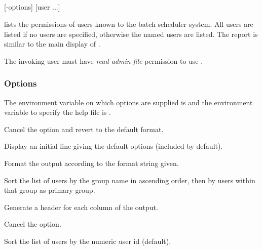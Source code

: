 \subsection{\BtulistName}

\begin{expara}

\BtulistName{} [-options] [user ...]

\end{expara}

\PrBtulist{} lists the permissions of users known to the \ProductName{} batch scheduler system. All users are listed
if no users are specified, otherwise the named users are listed. The report is similar to the main display of
\PrBtuser{}.

The invoking user must have \textit{read admin file} permission to use \PrBtulist{}.

\subsubsection{Options}
The environment variable on which options are supplied is \filename{\BtulistVarname} and the environment variable to specify the
help file is .

\explainopt


Cancel the  option and revert to the default format.


Display an initial line giving the default options (included by default).


Format the output according to the format string given.


Sort the list of users by the group name in ascending order, then by users within that group as primary group.


Generate a header for each column of the output.


Cancel the  option.


Sort the list of users by the numeric user id (default).

